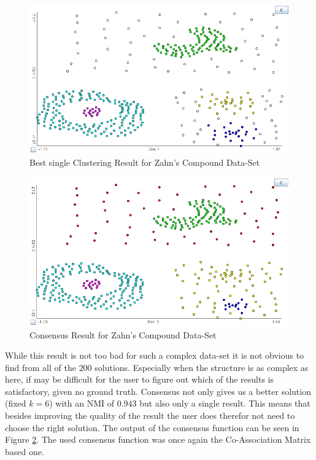 \documentclass[
	a4paper,
	english,
	twoside,
	openright,               
	11pt                            
	]{report}
\begin{document}
\begin{figure}[h]
	\centering
	\includegraphics[scale=.4]{zahn_best}
	\caption{Best single Clustering Result for Zahn's Compound Data-Set}
	\label{fig:zahn_best}
\end{figure}
\begin{figure}[h]
	\centering
	\includegraphics[scale=.4]{zahn_consensus}
	\caption{Consensus Result for Zahn's Compound Data-Set}
	\label{fig:zahn_consensus}
\end{figure}

While this result is not too bad for such a complex data-set it is not obvious to find from all of the $200$ solutions. Especially when the structure is as complex as here, if may be difficult for the user to figure out which of the results is satisfactory, given no ground truth. Consensus not only gives us a better solution (fixed $k=6$) with an NMI of $0.943$ but also only a single result. This means that besides improving the quality of the result the user does therefor not need to choose the right solution. The output of the consensus function can be seen in Figure \ref{fig:zahn_consensus}. The used consensus function was once again the  Co-Association Matrix based one.
\end{document}
